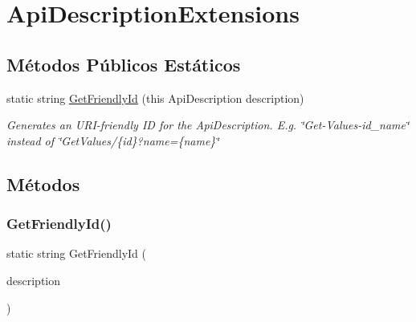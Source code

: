 \hypertarget{classApi3Layers_1_1Areas_1_1HelpPage_1_1ApiDescriptionExtensions}{}\section{Api\+Description\+Extensions}
\label{classApi3Layers_1_1Areas_1_1HelpPage_1_1ApiDescriptionExtensions}
\subsection*{Métodos Públicos Estáticos}
\begin{DoxyCompactItemize}
\item 
static string \hyperlink{classApi3Layers_1_1Areas_1_1HelpPage_1_1ApiDescriptionExtensions_a5f8d2a5e57d2cee70458b3dfc93be73c}{Get\+Friendly\+Id} (this Api\+Description description)
\begin{DoxyCompactList}\small\item\em Generates an U\+R\+I-\/friendly ID for the Api\+Description. E.\+g. \char`\"{}\+Get-\/\+Values-\/id\+\_\+name\char`\"{} instead of \char`\"{}\+Get\+Values/\{id\}?name=\{name\}\char`\"{} \end{DoxyCompactList}\end{DoxyCompactItemize}


\subsection{Métodos}
\mbox{\label{classApi3Layers_1_1Areas_1_1HelpPage_1_1ApiDescriptionExtensions_a5f8d2a5e57d2cee70458b3dfc93be73c}} 
\subsubsection{\texorpdfstring{Get\+Friendly\+Id()}{GetFriendlyId()}}
{\footnotesize\ttfamily static string Get\+Friendly\+Id (\begin{DoxyParamCaption}\item[{this Api\+Description}]{description }\end{DoxyParamCaption})\hspace{0.3cm}{\ttfamily [static]}}



